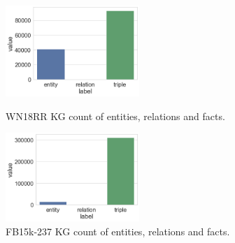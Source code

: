 \begin{figure}[H]
	\parbox{.5\linewidth}{
   		\centering
    		\includegraphics[width=0.45\textwidth]{WN18RR_Counts}
		\caption{WN18RR KG count of entities, relations and facts.}
		}
	\hfill
	\parbox{.5\linewidth}{
   		\centering
    		\includegraphics[width=0.45\textwidth]{FB15k-237_Counts}
		\caption{FB15k-237 KG count of entities, relations and facts.}
		}
\end{figure}


